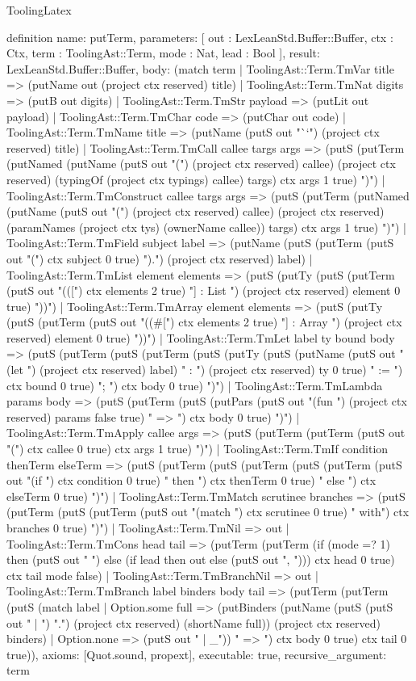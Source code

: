 \begin{lexlean}{ToolingLatex}
\begin{semanticmodule}
definition{
  name: putTerm,
  parameters: [
    out : LexLeanStd.Buffer::Buffer,
    ctx : Ctx,
    term : ToolingAst::Term,
    mode : Nat,
    lead : Bool
  ],
  result: LexLeanStd.Buffer::Buffer,
  body: (match term
    | ToolingAst::Term.TmVar title => (putName out (project ctx reserved) title)
    | ToolingAst::Term.TmNat digits => (putB out digits)
    | ToolingAst::Term.TmStr payload => (putLit out payload)
    | ToolingAst::Term.TmChar code => (putChar out code)
    | ToolingAst::Term.TmName title => (putName (putS out "``") (project ctx reserved) title)
    | ToolingAst::Term.TmCall callee targs args => (putS (putTerm (putNamed (putName (putS out "(") (project ctx reserved) callee) (project ctx reserved) (typingOf (project ctx typings) callee) targs) ctx args 1 true) ")")
    | ToolingAst::Term.TmConstruct callee targs args => (putS (putTerm (putNamed (putName (putS out "(") (project ctx reserved) callee) (project ctx reserved) (paramNames (project ctx tys) (ownerName callee)) targs) ctx args 1 true) ")")
    | ToolingAst::Term.TmField subject label => (putName (putS (putTerm (putS out "(") ctx subject 0 true) ").") (project ctx reserved) label)
    | ToolingAst::Term.TmList element elements => (putS (putTy (putS (putTerm (putS out "(([") ctx elements 2 true) "] : List ") (project ctx reserved) element 0 true) "))")
    | ToolingAst::Term.TmArray element elements => (putS (putTy (putS (putTerm (putS out "((#[") ctx elements 2 true) "] : Array ") (project ctx reserved) element 0 true) "))")
    | ToolingAst::Term.TmLet label ty bound body => (putS (putTerm (putS (putTerm (putS (putTy (putS (putName (putS out "(let ") (project ctx reserved) label) " : ") (project ctx reserved) ty 0 true) " := ") ctx bound 0 true) "; ") ctx body 0 true) ")")
    | ToolingAst::Term.TmLambda params body => (putS (putTerm (putS (putPars (putS out "(fun ") (project ctx reserved) params false true) " => ") ctx body 0 true) ")")
    | ToolingAst::Term.TmApply callee args => (putS (putTerm (putTerm (putS out "(") ctx callee 0 true) ctx args 1 true) ")")
    | ToolingAst::Term.TmIf condition thenTerm elseTerm => (putS (putTerm (putS (putTerm (putS (putTerm (putS out "(if ") ctx condition 0 true) " then ") ctx thenTerm 0 true) " else ") ctx elseTerm 0 true) ")")
    | ToolingAst::Term.TmMatch scrutinee branches => (putS (putTerm (putS (putTerm (putS out "(match ") ctx scrutinee 0 true) " with") ctx branches 0 true) ")")
    | ToolingAst::Term.TmNil => out
    | ToolingAst::Term.TmCons head tail => (putTerm (putTerm (if (mode =? 1) then (putS out " ") else (if lead then out else (putS out ", "))) ctx head 0 true) ctx tail mode false)
    | ToolingAst::Term.TmBranchNil => out
    | ToolingAst::Term.TmBranch label binders body tail => (putTerm (putTerm (putS (match label
      | Option.some full => (putBinders (putName (putS (putS out " | ") ".") (project ctx reserved) (shortName full)) (project ctx reserved) binders)
      | Option.none => (putS out " | _")) " => ") ctx body 0 true) ctx tail 0 true)),
  axioms: [Quot.sound, propext],
  executable: true,
  recursive_argument: term
}


\end{semanticmodule}
\end{lexlean}
